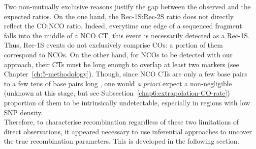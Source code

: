 Two non-mutually exclusive reasons justify the gap between the observed and the expected ratios.
On the one hand, the Rec-1S:Rec-2S ratio does not directly reflect the CO:NCO ratio.
Indeed, everytime one edge of a sequenced fragment falls into the middle of a NCO CT, this event is necessarily detected as a Rec-1S. 
Thus, Rec-1S events do not exclusively comprise COs: a portion of them correspond to NCOs.
On the other hand, for NCOs to be detected with our approach, their CTs must be long enough to overlap at least two markers (see Chapter~\ref{ch:5-methodology}).
Though, since NCO CTs are only a few base pairs to a few tens of base pairs long \citep{cole2014mouse}, one would \textit{a priori} expect a non-negligible (unknown at this stage, but see Subsection~\ref{chap6:extrapolation-CO-rate}) proportion of them to be intrinsically undetectable, especially in regions with low SNP density.\\

Therefore, to characterise recombination regardless of these two limitations of direct observations, it appeared necessary to use inferential approaches to uncover the true recombination parameters. This is developed in the following section.







